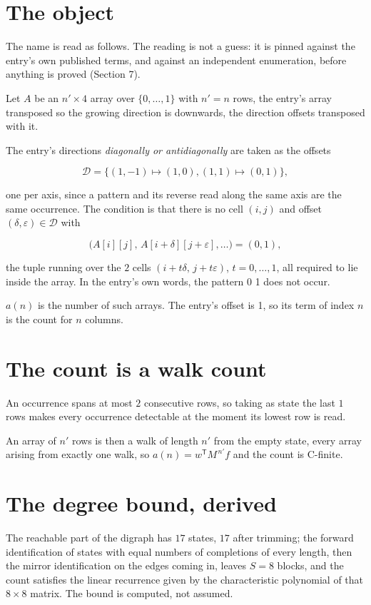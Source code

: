 \documentclass[11pt]{article}
\theoremstyle{definition}
\begin{document}
\section{The object}

The name is read as follows. The reading is not a guess: it is pinned against the entry's own published terms, and against an independent enumeration, before anything is proved (Section 7).

Let $A$ be an $n' \times 4$ array over $\{0,\dots,1\}$ with $n' = n$ rows, the entry's array transposed so the growing direction is downwards, the direction offsets transposed with it.

The entry's directions {\itshape diagonally or antidiagonally} are taken as the offsets

\[\mathcal{D} = \{(1,-1)\mapsto(1,0), (1,1)\mapsto(0,1)\},\]

one per axis, since a pattern and its reverse read along the same axis are the same occurrence. The condition is that there is no cell $(i,j)$ and offset $(\delta,\varepsilon)\in\mathcal{D}$ with

\[\bigl(A[i][j],\,A[i{+}\delta][j{+}\varepsilon],\dots\bigr) = (0, 1),\]

the tuple running over the $2$ cells $(i+t\delta,\,j+t\varepsilon)$, $t = 0,\dots,1$, all required to lie inside the array. In the entry's own words, the pattern 0 1 does not occur.

$a(n)$ is the number of such arrays. The entry's offset is 1, so its term of index $n$ is the count for $n$ columns.

\section{The count is a walk count}

An occurrence spans at most $2$ consecutive rows, so taking as state the last $1$ rows makes every occurrence detectable at the moment its lowest row is read.

An array of $n'$ rows is then a walk of length $n'$ from the empty state, every array arising from exactly one walk, so $a(n) = w^{\mathsf T}M^{\,n'}f$ and the count is C-finite.

\section{The degree bound, derived}

The reachable part of the digraph has $17$ states, $17$ after trimming; the forward identification of states with equal numbers of completions of every length, then the mirror identification on the edges coming in, leaves $S = 8$ blocks, and the count satisfies the linear recurrence given by the characteristic polynomial of that $8\times8$ matrix. The bound is computed, not assumed.
\end{document}

